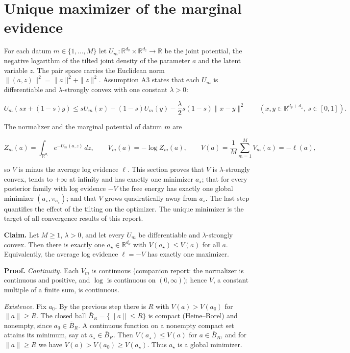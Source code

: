 \documentclass[11pt,a4paper]{report}
\begin{document}
\section{\texorpdfstring{Unique maximizer of the marginal evidence}{Unique maximizer of the marginal evidence}}


For each datum \(m\in\{1,\dots,M\}\) let \(U_m:\mathbb R^{d_\theta}\times\mathbb R^{d_z}\to\mathbb R\) be the joint potential, the negative logarithm of the tilted joint density of the parameter \(a\) and the latent variable \(z\). The pair space carries the Euclidean norm \(\|(a,z)\|^2=\|a\|^2+\|z\|^2\). Assumption A3 states that each \(U_m\) is differentiable and \(\lambda\)-strongly convex with one constant \(\lambda>0\):


\[U_m(sx+(1-s)y)\le sU_m(x)+(1-s)U_m(y)-\frac\lambda2s(1-s)\|x-y\|^2\qquad(x,y\in\mathbb R^{d_\theta+d_z},\ s\in[0,1]).\]


The normalizer and the marginal potential of datum \(m\) are


\[Z_m(a)=\int_{\mathbb R^{d_z}}e^{-U_m(a,z)}\,dz,\qquad V_m(a)=-\log Z_m(a),\qquad V(a)=\frac1M\sum_{m=1}^MV_m(a)=-\ell(a),\]


so \(V\) is minus the average log evidence \(\ell\). This section proves that \(V\) is \(\lambda\)-strongly convex, tends to \(+\infty\) at infinity and has exactly one minimizer \(a_\star\); that for every posterior family with log evidence \(-V\) the free energy has exactly one global minimizer \((a_\star,\pi_{a_\star})\); and that \(V\) grows quadratically away from \(a_\star\). The last step quantifies the effect of the tilting on the optimizer. The unique minimizer is the target of all convergence results of this report.



\textbf{Claim.} Let \(M\ge1\), \(\lambda>0\), and let every \(U_m\) be differentiable and \(\lambda\)-strongly convex. Then there is exactly one \(a_\star\in\mathbb R^{d_\theta}\) with \(V(a_\star)\le V(a)\) for all \(a\). Equivalently, the average log evidence \(\ell=-V\) has exactly one maximizer.




\textbf{Proof.} \emph{Continuity.} Each \(V_m\) is continuous (companion report: the normalizer is continuous and positive, and \(\log\) is continuous on \((0,\infty)\)); hence \(V\), a constant multiple of a finite sum, is continuous.




\emph{Existence.} Fix \(a_0\). By the previous step there is \(R\) with \(V(a)>V(a_0)\) for \(\|a\|\ge R\). The closed ball \(\bar B_R=\{\|a\|\le R\}\) is compact (Heine–Borel) and nonempty, since \(a_0\in\bar B_R\). A continuous function on a nonempty compact set attains its minimum, say at \(a_\star\in\bar B_R\). Then \(V(a_\star)\le V(a)\) for \(a\in\bar B_R\), and for \(\|a\|\ge R\) we have \(V(a)>V(a_0)\ge V(a_\star)\). Thus \(a_\star\) is a global minimizer.
\end{document}
